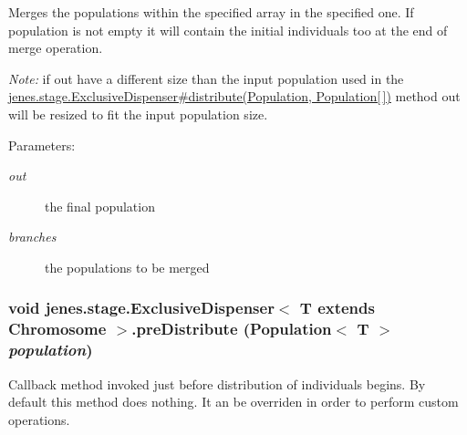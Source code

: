 Merges the populations within the specified array in the specified one. If population is not empty it will contain the initial individuals too at the end of merge operation.

{\em Note:\/} if out have a different size than the input population used in the \hyperlink{}{jenes.stage.ExclusiveDispenser\#distribute(Population, Population\mbox{[}$\,$\mbox{]})} method out will be resized to fit the input population size. 

\begin{Desc}
\item[Parameters:]
\begin{description}
\item[{\em out}]the final population \item[{\em branches}]the populations to be merged \end{description}
\end{Desc}
\hypertarget{classjenes_1_1stage_1_1_exclusive_dispenser_3_01_t_01extends_01_chromosome_01_4_d5db6c2748cabd6055a33421f601dba4}{
\subsubsection[preDistribute]{\setlength{\rightskip}{0pt plus 5cm}void jenes.stage.ExclusiveDispenser$<$ T extends Chromosome $>$.preDistribute (Population$<$ T $>$ {\em population})}}
\label{classjenes_1_1stage_1_1_exclusive_dispenser_3_01_t_01extends_01_chromosome_01_4_d5db6c2748cabd6055a33421f601dba4}


Callback method invoked just before distribution of individuals begins. By default this method does nothing. It an be overriden in order to perform custom operations.

